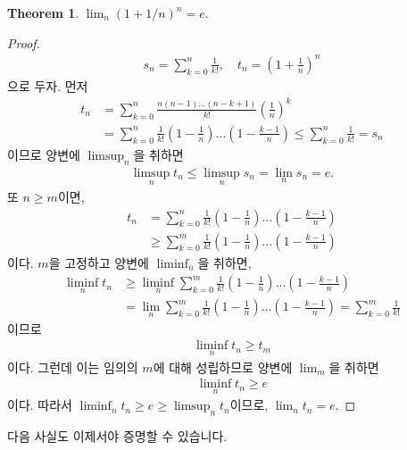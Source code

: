 \documentclass[12pt]{article}
\theoremstyle{definition}
\newtheorem{thm}{Theorem}[section]
\begin{document}
\begin{thm} \label{thm e}
	\(\lim_n (1 + 1/n)^n = e\).
\end{thm}
\begin{proof}
	\begin{gather*}
		s_n = \sum_{k=0}^{n} \frac{1}{k!}, \quad t_n = \left(1 + \frac{1}{n}\right)^n
	\end{gather*}
	으로 두자. 먼저
	\begin{align*}
		t_n &= \sum_{k=0}^{n} \frac{n(n-1)\ldots(n-k+1)}{k!}\left (\frac{1}{n}\right )^k\\
		&= \sum_{k=0}^{n}\frac{1}{k!}\left(1 - \frac{1}{n}\right)\ldots\left(1 - \frac{k-1}{n}\right) \le \sum_{k=0}^{n}\frac{1}{k!} = s_n
	\end{align*}
	이므로 양변에 \(\limsup_n\)을 취하면
	\begin{align*}
		\limsup_n t_n \le \limsup_n s_n = \lim_n s_n = e.
	\end{align*}
	또 \(n \ge m\)이면,
	\begin{align*}
		t_n &= \sum_{k=0}^{n}\frac{1}{k!}\left(1 - \frac{1}{n}\right)\ldots\left(1 - \frac{k-1}{n}\right)\\
		&\ge \sum_{k=0}^{m}\frac{1}{k!}\left(1 - \frac{1}{n}\right)\ldots\left(1 - \frac{k-1}{n}\right)
	\end{align*}
	이다. \(m\)을 고정하고 양변에 \(\liminf_n\)을 취하면,
	\begin{align*}
		\liminf_n t_n &\ge \liminf_n \sum_{k=0}^{m}\frac{1}{k!}\left(1 - \frac{1}{n}\right)\ldots\left(1 - \frac{k-1}{n}\right)\\
		&= \lim_n \sum_{k=0}^{m}\frac{1}{k!}\left(1 - \frac{1}{n}\right)\ldots\left(1 - \frac{k-1}{n}\right) = \sum_{k=0}^{m}\frac{1}{k!}
	\end{align*}
	이므로
	\begin{align*}
		\liminf_n t_n \ge t_m
	\end{align*}
	이다. 그런데 이는 임의의 \(m\)에 대해 성립하므로 양변에 \(\lim_m\)을 취하면
	\begin{align*}
		\liminf_n t_n \ge e
	\end{align*}
	이다. 따라서 \(\liminf_n t_n \ge e \ge \limsup_n t_n\)이므로, \(\lim_n t_n = e\).
\end{proof}

다음 사실도 이제서야 증명할 수 있습니다.
\end{document}
